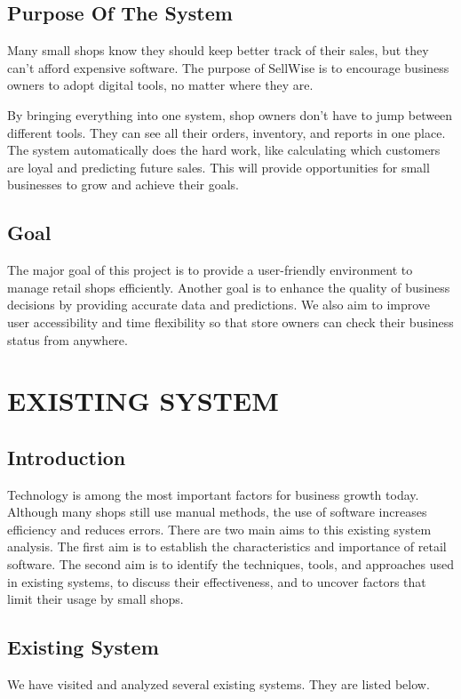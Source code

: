 \documentclass[12pt,a4paper]{report}
\begin{document}
\section{Purpose Of The System}
Many small shops know they should keep better track of their sales, but they can't afford expensive software. The purpose of SellWise is to encourage business owners to adopt digital tools, no matter where they are. 

By bringing everything into one system, shop owners don't have to jump between different tools. They can see all their orders, inventory, and reports in one place. The system automatically does the hard work, like calculating which customers are loyal and predicting future sales. This will provide opportunities for small businesses to grow and achieve their goals.

\section{Goal}
The major goal of this project is to provide a user-friendly environment to manage retail shops efficiently. Another goal is to enhance the quality of business decisions by providing accurate data and predictions. We also aim to improve user accessibility and time flexibility so that store owners can check their business status from anywhere.

\chapter{EXISTING SYSTEM}

\section{Introduction}
Technology is among the most important factors for business growth today. Although many shops still use manual methods, the use of software increases efficiency and reduces errors. There are two main aims to this existing system analysis. The first aim is to establish the characteristics and importance of retail software. The second aim is to identify the techniques, tools, and approaches used in existing systems, to discuss their effectiveness, and to uncover factors that limit their usage by small shops. 

\section{Existing System}
We have visited and analyzed several existing systems. They are listed below.
\end{document}
